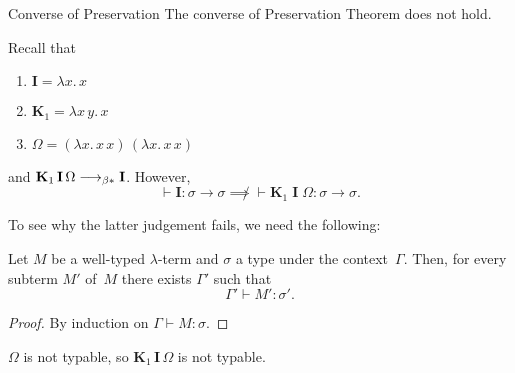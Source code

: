 \begin{frame}[allowframebreaks]{Converse of Preservation}
The converse of Preservation Theorem does not hold.
\begin{example}
  Recall that 
  \begin{enumerate}
    \item $\mathbf{I} = \lambda x.\, x$
    \item $\mathbf{K}_1 = \lambda x\,y.\, x$
    \item $\Omega = (\lambda x.\, x\,x)\,(\lambda x.\, x\,x)$
  \end{enumerate}
  and $\mathbf{K}_1\,\mathbf{I}\,\Omega \longrightarrow_{\beta*} \mathbf{I}$. However, 
  \[
    \vdash \mathbf{I} : \sigma \to \sigma
    \not\implies
    \vdash \mathbf{K}_1\;\mathbf{I}\;\Omega : \sigma \to \sigma.
  \]
\end{example}
\framebreak
To see why the latter judgement fails, we need the following:
\begin{lemma}
  Let $M$ be a well-typed $\lambda$-term and $\sigma$ a type under the
  context~$\Gamma$. Then, for every subterm $M'$ of~$M$ there exists $\Gamma'$
  such that
  \[
    \Gamma' \vdash M' : \sigma'.
  \]
\end{lemma}
\begin{proof}
  By induction on $\Gamma \vdash M : \sigma$.
\end{proof}
  $\Omega$ is not typable, so $\mathbf{K}_1\,\mathbf{I}\,\Omega$ is not typable.
\end{frame}

